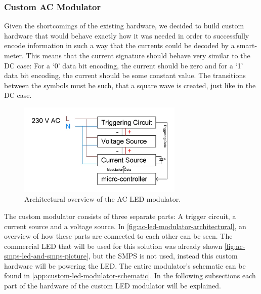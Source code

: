 
\subsubsection{Custom AC Modulator}






Given the shortcomings of the existing hardware, we decided to build custom hardware that would behave exactly how it was needed in order to successfully encode information in such a way that the currents could be decoded by a smart-meter.
This means that the current signature should behave very similar to the DC case: For a `0' data bit encoding, the current should be zero and for a `1' data bit encoding, the current should be some constant value.
The transitions between the symbols must be such, that a square wave is created, just like in the DC case. 

\begin{figure}[b]
	\centering
	\includegraphics[angle=0,width=0.7\textwidth]{chapters/hardware-chapters/AC/ac-modulator/custom-hardware/ac-modulator-architectural.JPG}
	\caption{Architectural overview of the AC LED modulator.}
	\label{fig:ac-led-modulator-architectural}
\end{figure}

The custom modulator consists of three separate parts: A trigger circuit, a current source and a voltage source.
In \autoref{fig:ac-led-modulator-architectural}, an overview of how these parts are connected to each other can be seen.
The commercial LED that will be used for this solution was already shown \autoref{fig:ac-smps-led-and-smps-picture}, but the SMPS is not used, instead this custom hardware will be powering the LED. 
The entire modulator's schematic can be found in \autoref{app:custom-led-modulator-schematic}.
In the following subsections each part of the hardware of the custom LED modulator will be explained.









